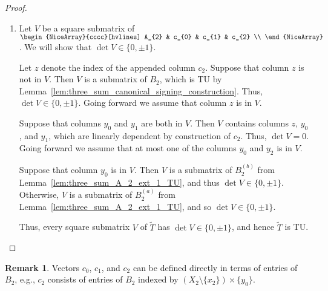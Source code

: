\documentclass{article}
\theoremstyle{definition}
\newtheorem{remark}[theorem]{Remark}
\begin{document}
\begin{proof}
\begin{enumerate}
        \item Let $V$ be a square submatrix of $\begin{NiceArray}{cccc}[hvlines] A_{2} & c_{0} & c_{1} & c_{2} \\ \end{NiceArray}$. We will show that $\det V \in \{0, \pm 1\}$.

        Let $z$ denote the index of the appended column $c_{2}$. Suppose that column $z$ is not in $V$. Then $V$ is a submatrix of $B_{2}$, which is TU by Lemma~\ref{lem:three_sum_canonical_signing_construction}. Thus, $\det V \in \{0, \pm 1\}$. Going forward we assume that column $z$ is in $V$.

        Suppose that columns $y_{0}$ and $y_{1}$ are both in $V$. Then $V$ contains columns $z$, $y_{0}$, and $y_{1}$, which are linearly dependent by construction of $c_{2}$. Thus, $\det V = 0$. Going forward we assume that at most one of the columns $y_{0}$ and $y_{2}$ is in $V$.

        Suppose that column $y_{0}$ is in $V$. Then $V$ is a submatrix of $B_{2}^{(b)}$ from Lemma~\ref{lem:three_sum_A_2_ext_1_TU}, and thus $\det V \in \{0, \pm 1\}$. Otherwise, $V$ is a submatrix of $B_{2}^{(a)}$ from Lemma~\ref{lem:three_sum_A_2_ext_1_TU}, and so $\det V \in \{0, \pm 1\}$.

        Thus, every square submatrix $V$ of $\tilde{T}$ has $\det V \in \{0, \pm 1\}$, and hence $\tilde{T}$ is TU.
    \end{enumerate}
\end{proof}

\begin{remark}
    Vectors $c_{0}$, $c_{1}$, and $c_{2}$ can be defined directly in terms of entries of $B_{2}$, e.g., $c_{2}$ consists of entries of $B_{2}$ indexed by $(X_{2} \setminus \{x_{2}\}) \times \{y_{0}\}$.
\end{remark}
\end{document}
